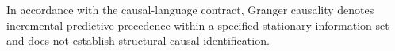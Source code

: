 \begin{table}[htbp]
\begin{minipage}{0.98\textwidth}
In accordance with the causal-language contract, Granger causality denotes incremental predictive precedence within a specified stationary information set and does not establish structural causal identification.
\end{minipage}
\end{table}
